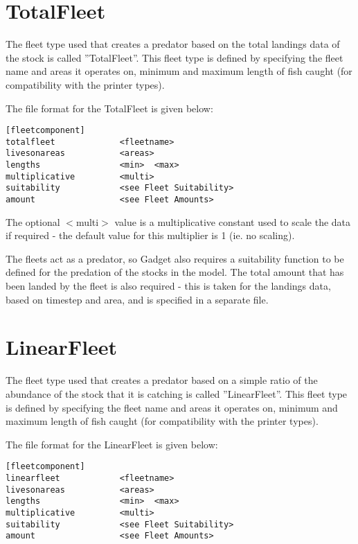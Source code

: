 \documentclass [a4paper, 10pt]{book}
\begin{document}
\newpage %
\section{TotalFleet}\label{sec:totalfleet}
The fleet type used that creates a predator based on the total landings data of the stock is called ''TotalFleet''.  This fleet type is defined by specifying the fleet name and areas it operates on, minimum and maximum length of fish caught (for compatibility with the printer types).

\bigskip
The file format for the TotalFleet is given below:

{\small\begin{verbatim}
[fleetcomponent]
totalfleet             <fleetname>
livesonareas           <areas>
lengths                <min>  <max>
multiplicative         <multi>
suitability            <see Fleet Suitability>
amount                 <see Fleet Amounts>
\end{verbatim}}

The optional $<$multi$>$ value is a multiplicative constant used to scale the data if required - the default value for this multiplier is 1 (ie. no scaling).

\bigskip
The fleets act as a predator, so Gadget also requires a suitability function to be defined for the predation of the stocks in the model.  The total amount that has been landed by the fleet is also required - this is taken for the landings data, based on timestep and area, and is specified in a separate file.

\section{LinearFleet}\label{sec:linearfleet}
The fleet type used that creates a predator based on a simple ratio of the abundance of the stock that it is catching is called ''LinearFleet''.  This fleet type is defined by specifying the fleet name and areas it operates on, minimum and maximum length of fish caught (for compatibility with the printer types).

\bigskip
The file format for the LinearFleet is given below:

{\small\begin{verbatim}
[fleetcomponent]
linearfleet            <fleetname>
livesonareas           <areas>
lengths                <min>  <max>
multiplicative         <multi>
suitability            <see Fleet Suitability>
amount                 <see Fleet Amounts>
\end{verbatim}}
\end{document}

